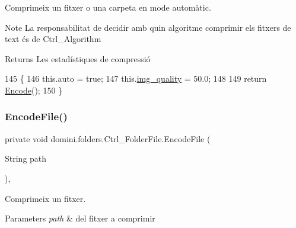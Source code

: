 Comprimeix un fitxer o una carpeta en mode automàtic. 

\begin{DoxyNote}{Note}
La responsabilitat de decidir amb quin algoritme comprimir els fitxers de text és de Ctrl\+\_\+\+Algorithm 
\end{DoxyNote}
\begin{DoxyReturn}{Returns}
Les estadístiques de compressió 
\end{DoxyReturn}

\begin{DoxyCode}
145                                \{
146         this.\textcolor{keyword}{auto} = \textcolor{keyword}{true};
147         this.\hyperlink{classdomini_1_1folders_1_1Ctrl__FolderFile_a7990a74c394d53a58ebbf4a7872c700d}{img\_quality} = 50.0;
148 
149         \textcolor{keywordflow}{return} \hyperlink{classdomini_1_1folders_1_1Ctrl__FolderFile_a7c47fd5127ae6f713a4fa7f75002a6f6}{Encode}();
150     \}
\end{DoxyCode}
\mbox{\label{classdomini_1_1folders_1_1Ctrl__FolderFile_a0b2b642b6c23124539d0306955be7f0c}} 
\subsubsection{\texorpdfstring{Encode\+File()}{EncodeFile()}}
{\footnotesize\ttfamily private void domini.\+folders.\+Ctrl\+\_\+\+Folder\+File.\+Encode\+File (\begin{DoxyParamCaption}\item[{String}]{path }\end{DoxyParamCaption})\hspace{0.3cm}{\ttfamily [inline]}, {\ttfamily [private]}}



Comprimeix un fitxer. 


\begin{DoxyParams}{Parameters}
{\em path} & del fitxer a comprimir \\
\hline
\end{DoxyParams}


